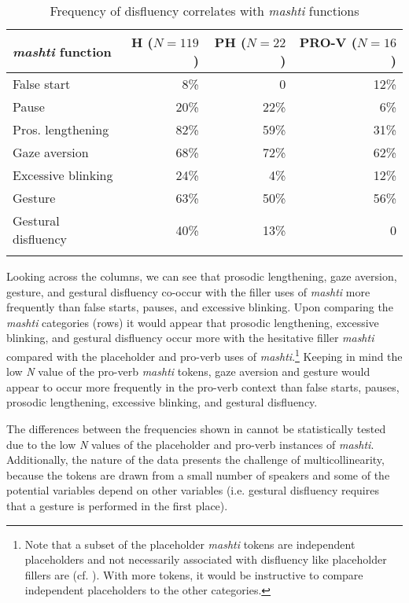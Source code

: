 \documentclass[output=paper]{langscibook}
\begin{document}
\begin{table}
\begin{tabular}{l rrr}
\lsptoprule
{\textit{mashti}} function & H ($N=119$) & PH ($N=22$) & PRO-V ($N=16$) \\
\midrule
False start                & 8\%       & 0         & 12\%\\
Pause                      & 20\%      & 22\%      & 6\% \\
Pros. lengthening          & 82\%      & 59\%      & 31\%\\
Gaze aversion              & 68\%      & 72\%      & 62\%\\
Excessive blinking         & 24\%      & 4\%       & 12\%\\
Gesture                    & 63\%      & 50\%      & 56\%\\
Gestural disfluency           & 40\%      & 13\%      & 0\\
\lspbottomrule
\end{tabular}
\caption{\label{tab:rice:15}Frequency of disfluency correlates with \textit{mashti} functions}
\end{table}

Looking across the columns, we can see that prosodic lengthening, gaze aversion, gesture, and gestural disfluency co-occur with the filler uses of \textit{mashti} more frequently than false starts, pauses, and excessive blinking. Upon comparing the \textit{mashti} categories (rows) it would appear that prosodic lengthening, excessive blinking, and gestural disfluency occur more with the hesitative filler \textit{mashti} compared with the placeholder and pro-verb uses of \textit{mashti}.\footnote{Note that a subset of the placeholder \textit{mashti} tokens are independent placeholders and not necessarily associated with disfluency like placeholder fillers are (cf. ). With more tokens, it would be instructive to compare independent placeholders to the other categories.} Keeping in mind the low \textit{N} value of the pro-verb \textit{mashti} tokens, gaze aversion and gesture would appear to occur more frequently in the pro-verb context than false starts, pauses, prosodic lengthening, excessive blinking, and gestural disfluency. 

The differences between the frequencies shown in  cannot be statistically tested due to the low \textit{N} values of the placeholder and pro-verb instances of \textit{mashti}. Additionally, the nature of the data presents the challenge of multicollinearity, because the tokens are drawn from a small number of speakers and some of the potential variables depend on other variables (i.e. gestural disfluency requires that a gesture is performed in the first place). 
\end{document}
